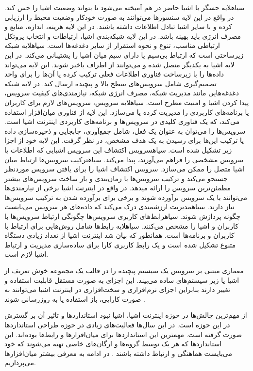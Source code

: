  ‌سیاه{لایه حسگر} با اشیا حاضر در هم آمیخته می‌شود تا بتواند وضعیت اشیا را حس کند. در واقع در این لایه سنسورها می‌توانند به صورت خودکار وضعیت محیط را ارزیابی کرده و با سایر اشیا تبادل اطلاعات داشته باشند.
در این لایه هزینه، اندازه، منابع و مصرف انرژی باید بهینه باشد. در این لایه شبکه‌بندی اشیا، ارتباطات و انتخاب پروتکل ارتباطی مناسب، تنوع و نحوه استقرار از سایر دغدغه‌ها است.
 ‌سیاه{لایه شبکه} زیرساختی است که ارتباط بی‌سیم یا دارای سیم میان اشیا را پشتیبانی می‌کند. در این لایه اشیا به یکدیگر متصل شده و می‌توانند از اطراف باخبر شوند. این لایه می‌تواند داده‌ها را با زیرساخت فناوری اطلاعات فعلی
ترکیب کرده یا آن‌ها را برای واحد تصمیم‌گیری شامل سرویس‌های سطح بالا و پیچیده ارسال کند. در لایه شبکه دغدغه‌هایی مانند مدیریت شبکه، مصرف انرژی شبکه، نیازمندی‌های کیفیت سرویس، پیدا کردن اشیا و امنیت مطرح است.
 ‌سیاه{لایه سرویس}، سرویس‌های لازم برای کاربران یا برنامه‌های کاربردی را مدیریت کرده یا می‌سازد. این لایه از فناوری میان‌افزار استفاده می‌کند، که یک فناوری کلیدی در سرویس‌ها و برنامه‌های کاربردی اینترنت اشیا است.
سرویس‌ها را می‌توان به عنوان یک فعل، شامل جمع‌آوری، جابجایی و ذخیره‌سازی داده یا ترکیب این‌ها برای رسیدن به یک هدف مشخص، در نظر گرفت.
این لایه خود از اجزا زیر تشکیل شده است.
 ‌سیاه{سرویس اکتشاف} این سرویس اشیایی که اطلاعات یا سرویس مشخصی را فراهم می‌آورند، پیدا می‌کند.
 ‌سیاه{ترکیب سرویس‌ها} ارتباط میان اشیا متصل را ممکن می‌سازد. سرویس اکتشاف اشیا را برای یافتن سرویس موردنظر جستجو می‌کند و ترکیب سرویس‌ها با زمان‌بندی و باز ساخت سرویس‌های بیشتر مطمئن‌ترین سرویس را ارائه میدهد.
در واقع در اینترنت اشیا برخی از نیازمندی‌ها می‌توانند با یک سرویس برآورده شوند و برخی برای برآورده شدن به ترکیب سرویس‌ها نیاز دارند.
 ‌سیاه{مدیریت ارزشمندی} درک می‌کند که داده‌های هر سرویس می‌بایست چگونه پردازش شوند.
 ‌سیاه{رابط‌های کاربری سرویس‌ها} چگونگی ارتباط سرویس‌ها با کاربران و اشیا را مشخص می‌کنند.
 ‌سیاه{لایه رابط‌ها} شامل روش‌هایی برای ارتباط با کاربران و برنامه‌ها است. همانطور که بیان شد اینترنت اشیا از تعداد زیادی دستگاه متنوع تشکیل شده است و یک رابط کاربری کارا برای ساده‌سازی مدیریت و ارتباط اشیا لازم است.

معماری مبتنی بر سرویس یک سیستم پیچیده را در قالب یک مجموعه خوش تعریف از اشیا یا زیر سیستم‌های ساده می‌بیند.
این اجزای به صورت مستقل قابلیت استفاده و تغییر دارند بنابراین اجزای نرم‌افزاری و سخت‌افزاری در اینترنت اشیا می‌توانند به صورت کارایی،
باز استفاده یا به روزرسانی شوند
.

از مهم‌ترین چالش‌ها در حوزه اینترنت اشیا، اشیا نبود استانداردها و تاثیر آن بر گسترش در این حوزه است. در این سال‌ها فعالیت‌های زیادی در حوزه طراحی استانداردها
صورت گرفته است. مهمترین این استانداردها برای میان‌افزارها و رابط‌ها بوده‌اند. این استانداردها که هر یک توسط گروه‌ها و ارگان‌های خاصی تهیه می‌شوند که
خود می‌بایست هماهنگی و ارتباط داشته باشند
.
در ادامه به معرفی بیشتر میان‌افزارها می‌پردازیم.

